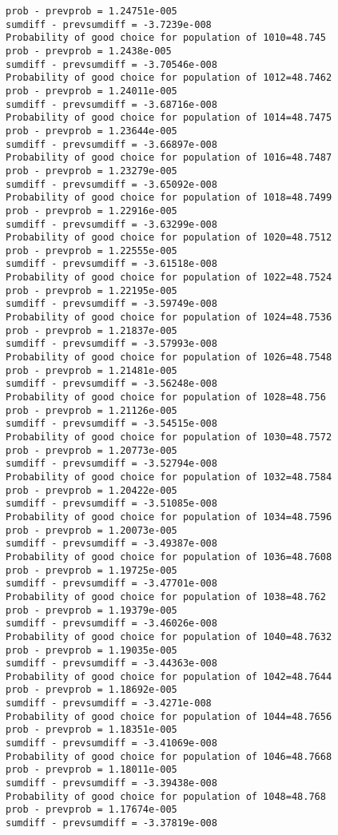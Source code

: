 \documentclass[11pt,onecolumn]{article}
\begin{document}
\begin{verbatim}
prob - prevprob = 1.24751e-005
sumdiff - prevsumdiff = -3.7239e-008
Probability of good choice for population of 1010=48.745
prob - prevprob = 1.2438e-005
sumdiff - prevsumdiff = -3.70546e-008
Probability of good choice for population of 1012=48.7462
prob - prevprob = 1.24011e-005
sumdiff - prevsumdiff = -3.68716e-008
Probability of good choice for population of 1014=48.7475
prob - prevprob = 1.23644e-005
sumdiff - prevsumdiff = -3.66897e-008
Probability of good choice for population of 1016=48.7487
prob - prevprob = 1.23279e-005
sumdiff - prevsumdiff = -3.65092e-008
Probability of good choice for population of 1018=48.7499
prob - prevprob = 1.22916e-005
sumdiff - prevsumdiff = -3.63299e-008
Probability of good choice for population of 1020=48.7512
prob - prevprob = 1.22555e-005
sumdiff - prevsumdiff = -3.61518e-008
Probability of good choice for population of 1022=48.7524
prob - prevprob = 1.22195e-005
sumdiff - prevsumdiff = -3.59749e-008
Probability of good choice for population of 1024=48.7536
prob - prevprob = 1.21837e-005
sumdiff - prevsumdiff = -3.57993e-008
Probability of good choice for population of 1026=48.7548
prob - prevprob = 1.21481e-005
sumdiff - prevsumdiff = -3.56248e-008
Probability of good choice for population of 1028=48.756
prob - prevprob = 1.21126e-005
sumdiff - prevsumdiff = -3.54515e-008
Probability of good choice for population of 1030=48.7572
prob - prevprob = 1.20773e-005
sumdiff - prevsumdiff = -3.52794e-008
Probability of good choice for population of 1032=48.7584
prob - prevprob = 1.20422e-005
sumdiff - prevsumdiff = -3.51085e-008
Probability of good choice for population of 1034=48.7596
prob - prevprob = 1.20073e-005
sumdiff - prevsumdiff = -3.49387e-008
Probability of good choice for population of 1036=48.7608
prob - prevprob = 1.19725e-005
sumdiff - prevsumdiff = -3.47701e-008
Probability of good choice for population of 1038=48.762
prob - prevprob = 1.19379e-005
sumdiff - prevsumdiff = -3.46026e-008
Probability of good choice for population of 1040=48.7632
prob - prevprob = 1.19035e-005
sumdiff - prevsumdiff = -3.44363e-008
Probability of good choice for population of 1042=48.7644
prob - prevprob = 1.18692e-005
sumdiff - prevsumdiff = -3.4271e-008
Probability of good choice for population of 1044=48.7656
prob - prevprob = 1.18351e-005
sumdiff - prevsumdiff = -3.41069e-008
Probability of good choice for population of 1046=48.7668
prob - prevprob = 1.18011e-005
sumdiff - prevsumdiff = -3.39438e-008
Probability of good choice for population of 1048=48.768
prob - prevprob = 1.17674e-005
sumdiff - prevsumdiff = -3.37819e-008

\end{verbatim}
\end{document}
